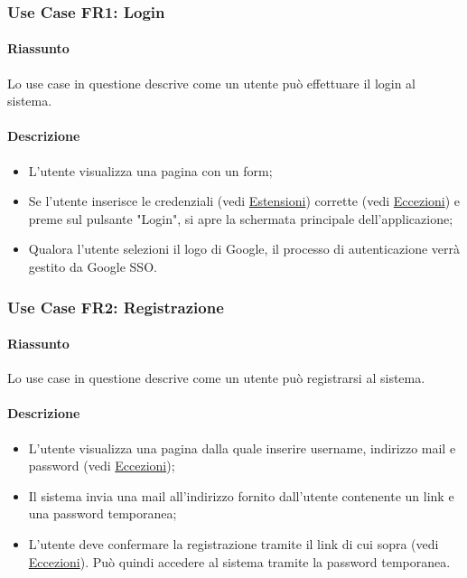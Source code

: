 \documentclass[9pt]{extarticle}
\begin{document}
\subsubsection*{Use Case FR1: Login}

\paragraph{Riassunto}

Lo use case in questione descrive come un utente può effettuare il login al sistema.

\paragraph{Descrizione}

\begin{itemize}
	\item L'utente visualizza una pagina con un form;
	\item Se l'utente inserisce le credenziali (vedi  \hyperref[Estensioni-FR2]{Estensioni}) corrette (vedi \hyperref[Eccezioni-FR2]{Eccezioni}) e preme sul pulsante "Login", si apre la schermata principale dell'applicazione;
	\item Qualora l'utente selezioni il logo di Google, il processo di autenticazione verrà gestito da Google SSO.
\end{itemize}

\subsubsection*{Use Case FR2: Registrazione}

\paragraph{Riassunto}

Lo use case in questione descrive come un utente può registrarsi al sistema.

\paragraph{Descrizione}

\begin{itemize}
	\item L'utente visualizza una pagina dalla quale inserire username, indirizzo mail e password (vedi \hyperref[Eccezioni-FR2]{Eccezioni});
	\item Il sistema invia una mail all'indirizzo fornito dall'utente contenente un link e una password temporanea;
	\item L'utente deve confermare la registrazione tramite il link di cui sopra (vedi \hyperref[Eccezioni-FR2]{Eccezioni}). Può quindi accedere al sistema tramite la password temporanea.
\end{itemize}
\end{document}

